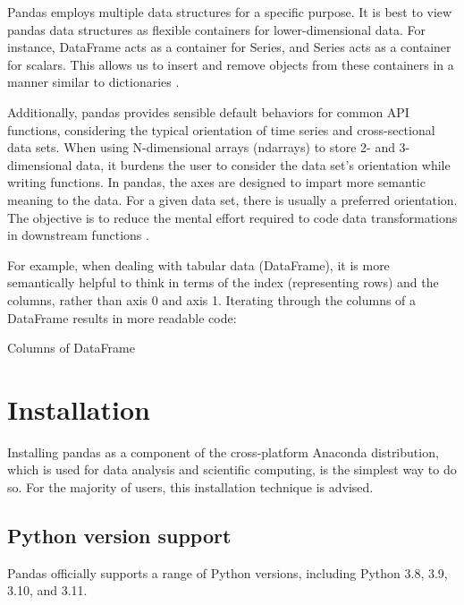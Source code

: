 	Pandas employs multiple data structures for a specific purpose. It is best to view pandas data structures as flexible containers for lower-dimensional data. For instance, DataFrame acts as a container for Series, and Series acts as a container for scalars. This allows us to insert and remove objects from these containers in a manner similar to dictionaries \cite{McKinney:2015}.
	
	Additionally, pandas provides sensible default behaviors for common API functions, considering the typical orientation of time series and cross-sectional data sets. When using N-dimensional arrays (ndarrays) to store 2- and 3-dimensional data, it burdens the user to consider the data set's orientation while writing functions. In pandas, the axes are designed to impart more semantic meaning to the data. For a given data set, there is usually a preferred orientation. The objective is to reduce the mental effort required to code data transformations in downstream functions \cite{McKinney:2012}.
	
	For example, when dealing with tabular data (DataFrame), it is more semantically helpful to think in terms of the index (representing rows) and the columns, rather than axis 0 and axis 1. Iterating through the columns of a DataFrame results in more readable code:

	\begin{code}[h!]
	    
	
	\caption{Columns of DataFrame}
	
   	\end{code}

	\section{Installation}
	
	Installing pandas as a component of the cross-platform Anaconda distribution, which is used for data analysis and scientific computing, is the simplest way to do so. For the majority of users, this installation technique is advised.
	
	\subsection{Python version support}
	
	Pandas officially supports a range of Python versions, including Python 3.8, 3.9, 3.10, and 3.11.
	
